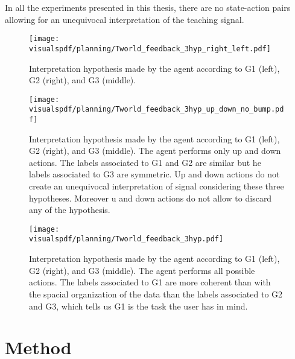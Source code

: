 In all the experiments presented in this thesis, there are no state-action pairs allowing for an unequivocal interpretation of the teaching signal.

\begin{figure}[!htbp]
  \centering
  \texttt{[image: \\visualspdf/planning/Tworld\_feedback\_3hyp\_right\_left.pdf]}
  \caption{Interpretation hypothesis made by the agent according to G1 (left), G2 (right), and G3 (middle). }
  \label{fig:planning3hyprightleft}
\end{figure}


\begin{figure}[!htbp]
  \centering
  \texttt{[image: \\visualspdf/planning/Tworld\_feedback\_3hyp\_up\_down\_no\_bump.pdf]}
  \caption{Interpretation hypothesis made by the agent according to G1 (left), G2 (right), and G3 (middle). The agent performs only up and down actions. The labels associated to G1 and G2 are similar but he labels associated to G3 are symmetric. Up and down actions do not create an unequivocal interpretation of signal considering these three hypotheses. Moreover u and down actions do not allow to discard any of the hypothesis.}
  \label{fig:planning3hypupdown}
\end{figure}

\begin{figure}[H]
  \centering
  \texttt{[image: \\visualspdf/planning/Tworld\_feedback\_3hyp.pdf]}
  \caption{Interpretation hypothesis made by the agent according to G1 (left), G2 (right), and G3 (middle). The agent performs all possible actions. The labels associated to G1 are more coherent than with the spacial organization of the data than the labels associated to G2 and G3, which tells us G1 is the task the user has in mind.}
  \label{fig:planning3hyp}
\end{figure}


\section{Method}
\label{chapter:planning:method}

